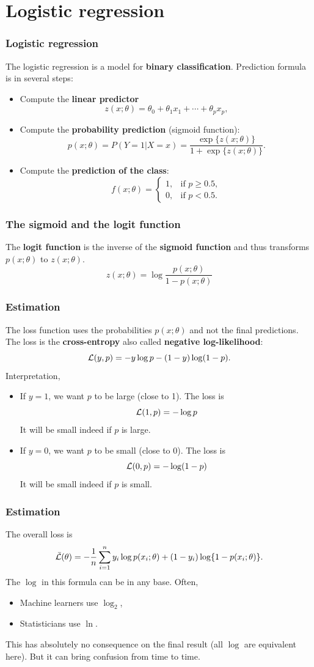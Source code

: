 \section{Logistic regression}
\begin{frame}
\frametitle{Logistic regression}
The logistic regression is a model for {\bf binary classification}. Prediction formula is in several steps:
\begin{itemize}
\item Compute the {\bf linear predictor}
$$
z(x;\theta) = \theta_0 + \theta_1 x_{1} + \cdots + \theta_p x_{p},
$$
\item Compute the {\bf probability prediction} (sigmoid function):
$$
p(x;\theta) = P(Y=1 | X=x) = \frac{\exp\{z(x;\theta)\}}{1+\exp\{z(x;\theta)\}}.
$$
\item Compute the {\bf prediction of the class}: 
$$
f(x;\theta) = \left\{
\begin{array}{ll}
1, & \mbox{if } p\geq 0.5,\\
0, & \mbox{if } p < 0.5.
\end{array}
\right.
$$
\end{itemize}
\end{frame}
\begin{frame}
\frametitle{The sigmoid and the logit function}
The {\bf logit function} is the inverse of the {\bf sigmoid function} and thus transforms $p(x;\theta)$ to $z(x;\theta)$.
$$
z(x;\theta) = \log \frac{p(x;\theta)}{1-p(x;\theta)}
$$ 
\end{frame}
\begin{frame}
\frametitle{Estimation}
The loss function uses the probabilities $p(x;\theta)$ and not the final predictions. The loss is the {\bf cross-entropy} also called {\bf negative log-likelihood}:
$$
{\cal L}(y,p) = -y \log p - (1-y) \log (1-p).
$$
Interpretation,
\begin{itemize}
\item If $y=1$, we want $p$ to be large (close to 1). The loss is 
$$
{\cal L}(1,p) = - \log p
$$
It will be small indeed if $p$ is large.
\item If $y=0$, we want $p$ to be small (close to 0). The loss is
$$
{\cal L}(0,p) = - \log (1-p)
$$
It will be small indeed if $p$ is small.
\end{itemize}
\end{frame}
\begin{frame}
\frametitle{Estimation}
The overall loss is
$$
\bar{{\cal L}}(\theta) = -\frac{1}{n} \sum_{i=1}^n y_i \log p(x_i;\theta) + (1-y_i) \log \{1-p(x_i;\theta)\}.
$$
The $\log$ in this formula can be in any base. Often,
\begin{itemize}
\item Machine learners use $\log_2$,
\item Statisticians use $\ln$.
\end{itemize}
This has absolutely no consequence on the final result (all $\log$ are equivalent here). But it can bring confusion from time to time.
\end{frame}
